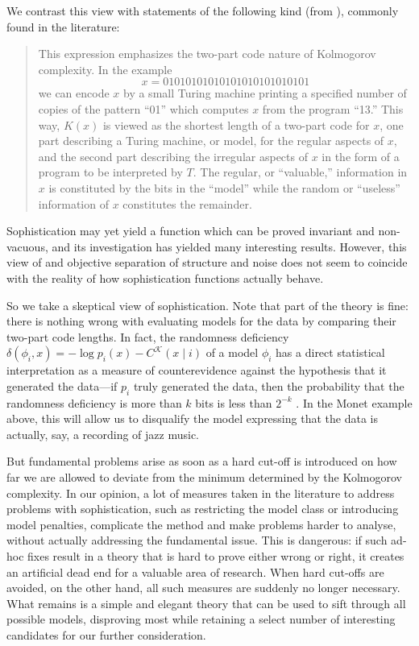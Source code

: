 \documentclass{style/llncs}
\newcommand{\K}{\mathscr K}
\begin{document}
We contrast this view with statements of the following kind (from \cite{vereshchagin2004kolmogorov}), commonly found in the literature:
\begin{quote}
This expression emphasizes the two-part code nature of Kolmogorov complexity. In the example
\[
x = 01010101010101010101010101
\]
we can encode $x$ by a small Turing machine printing a specified number of copies of the pattern ``01'' which computes $x$ from the program ``13.'' This way, $K(x)$ is viewed as the shortest length of a two-part code for $x$, one part describing a Turing machine, or model, for the regular aspects of $x$, and the second part describing the irregular aspects of $x$ in the form of a program to be interpreted by $T$. The regular, or ``valuable,'' information in $x$ is constituted by the bits in the ``model'' while the random or ``useless'' information of $x$ constitutes the remainder.
\end{quote}
Sophistication may yet yield a function which can be proved invariant and non-vacuous, and its investigation has yielded many interesting results. However, this view of and objective separation of structure and noise does not seem to coincide with the reality of how sophistication functions actually behave.

So we take a skeptical view of sophistication. Note that part of the theory is fine: there is nothing wrong with evaluating models for the data by comparing their two-part code lengths. In fact, the randomness deficiency $\delta(\phi_i,x)=-\log p_i(x)-C^\K(x\mid i)$ of a model $\phi_i$ has a direct statistical interpretation as a measure of counterevidence against the hypothesis that it generated the data---if $p_i$ truly generated the data, then the probability that the randomness deficiency is more than $k$ bits is less than $2^{-k}$ \cite[Lemma~6]{bloem2014safe}. In the Monet example above, this will allow us to disqualify the model expressing that the data is actually, say, a recording of jazz music.

But fundamental problems arise as soon as a hard cut-off is introduced on how far we are allowed to deviate from the minimum determined by the Kolmogorov complexity. In our opinion, a lot of measures taken in the literature to address problems with sophistication, such as restricting the model class or introducing model penalties, complicate the method and make problems harder to analyse, without actually addressing the fundamental issue. This is dangerous: if such ad-hoc fixes result in a theory that is hard to prove either wrong or right, it creates an artificial dead end for a valuable area of research. When hard cut-offs are avoided, on the other hand, all such measures are suddenly no longer necessary. What remains is a simple and elegant theory that can be used to sift through all possible models, disproving most while retaining a select number of interesting candidates for our further consideration.
\end{document}
